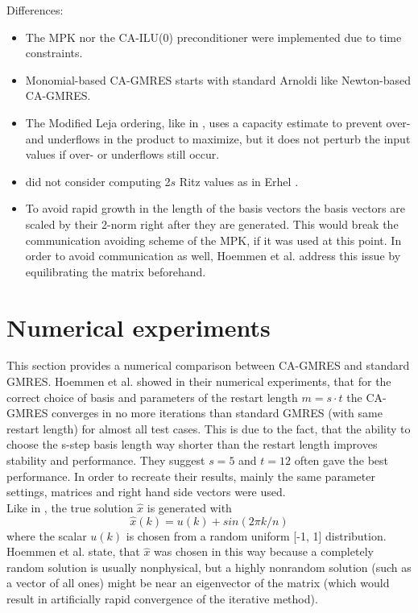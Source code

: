 \documentclass{scrartcl}
\numberwithin{equation}{section}
\begin{document}
Differences:
\begin{itemize}
\item The MPK nor the CA-ILU(0) preconditioner were implemented due to time constraints.
\item Monomial-based CA-GMRES starts with standard Arnoldi like Newton-based CA-GMRES.
\item The Modified Leja ordering, like in \cite{Hoemmen:2010:CKS:1970638}, uses a capacity estimate to prevent over- and underflows in the product to maximize, but it does not perturb the input values if over- or underflows still occur.
\item did not consider computing 2$s$ Ritz values as in Erhel \cite{Erhel95aparallel}.
\item To avoid rapid growth in the length of the basis vectors the basis vectors are scaled by their 2-norm right after they are generated. This would break the communication avoiding scheme of the MPK, if it was used at this point. In order to avoid communication as well, Hoemmen et al. address this issue by equilibrating the matrix beforehand.
\end{itemize}

\section{Numerical experiments}
This section provides a numerical comparison between CA-GMRES and standard GMRES. Hoemmen et al. \cite{Hoemmen:2010:CKS:1970638} showed in their numerical experiments, that for the correct choice of basis and parameters of the restart length $m = s \cdot t$ the CA-GMRES converges in no more iterations than standard GMRES (with same restart length) for almost all test cases. This is due to the fact, that the ability to choose the s-step basis length way shorter than the restart length improves stability and performance. They suggest $s = 5$ and $t = 12$ often gave the best performance. In order to recreate their results, mainly the same parameter settings, matrices and right hand side vectors were used.\\

Like in \cite{Hoemmen:2010:CKS:1970638}, the true solution $\hat{x}$ is generated with
\begin{equation}
	\hat{x}(k) = u(k) + sin(2\pi k/n)
\end{equation}
where the scalar $u(k)$ is chosen from a random uniform [-1, 1] distribution. 
Hoemmen et al. state, that $\hat{x}$ was chosen in this way because a completely random solution is usually nonphysical, but a highly nonrandom solution (such as a vector of all ones) might be near an eigenvector of the matrix (which would result in artificially rapid convergence of the iterative method).
\end{document}
